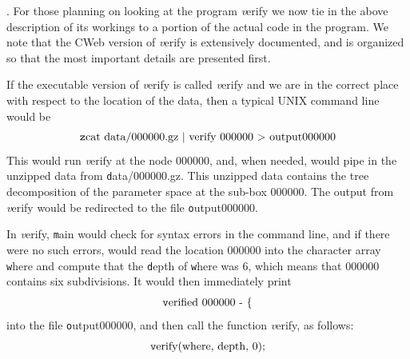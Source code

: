 \begin{remark} \label{GMT 5.5}
.  For those planning on looking at the program {\textit verify}
we now tie in the above description of its workings to a portion of the actual code in the program.  We note that the CWeb version of {\textit verify} is extensively documented, and is organized so that the most important details are presented first.

If the executable version of {\textit verify} is called {\textit verify} and we are in the correct place with respect to the location of the data, then a typical UNIX command line would be 
$$
\hbox{\texttt zcat data/000000.gz | verify 000000 > output000000} 
$$
This would run {\textit verify} at the node 000000, and, when needed, would pipe in the unzipped data from \hbox{\texttt
data/000000.gz}.  This unzipped data contains the tree decomposition of the parameter space at the sub-box 000000. 
The output from {\textit verify} would be redirected to the file \hbox{\texttt output000000}.

In {\textit verify}, \hbox{\texttt main} would check for syntax errors in the command line, and if there were no such errors, would read the location 000000 into the character array \hbox{\texttt where}  and compute that the \hbox{\texttt depth} of \hbox{\texttt where} was 6, which means that 000000 contains
six subdivisions.   It would then immediately print 
$$
\hbox{\texttt verified 000000 - } \{$$
into the file \hbox{\texttt output000000}, and then call the function {\textit verify}, as follows:
$$
\hbox{\texttt verify(where, depth, 0);}
$$


\end{remark}
